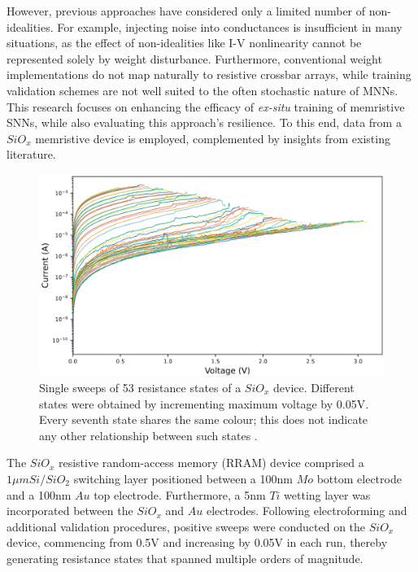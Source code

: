 
\noindent However, previous approaches have considered only a limited number of non-idealities. For example, injecting noise into conductances is insufficient in many situations, as the effect of non-idealities like I-V nonlinearity cannot be represented solely by weight disturbance. Furthermore, conventional weight implementations do not map naturally to resistive crossbar arrays, while training validation schemes are not well suited to the often stochastic nature of MNNs. This research focuses on enhancing the efficacy of \textit{ex-situ} training of memristive SNNs, while also evaluating this approach's resilience. To this end, data from a  $SiO_x$  memristive device is employed, complemented by insights from existing literature.\\

\begin{figure}[htbp!] 
\centering    
\includegraphics[width=1\textwidth]{Chapter6/Figs/g.png}
\caption[Single sweeps of 53 resistance states of a $SiO_x$ device.]{Single sweeps of 53 resistance states of a $SiO_x$ device. Different states were obtained by incrementing maximum voltage by 0.05V. Every seventh state shares the same colour; this does not indicate any other relationship between such states \cite{Barmpatsalos2021-yn}.}
\label{fig:6g}
\end{figure}


\noindent The $SiO_x$ resistive random-access memory (RRAM) device comprised a $1 \mu m Si/SiO_2$  switching layer positioned between a 100nm $Mo$ bottom electrode and a 100nm $Au$ top electrode. Furthermore, a 5nm $Ti$ wetting layer was incorporated between the $SiO_x$ and $Au$ electrodes. Following electroforming and additional validation procedures, positive sweeps were conducted on the $SiO_x$ device, commencing from 0.5V and increasing by 0.05V in each run, thereby generating resistance states that spanned multiple orders of magnitude.\\


